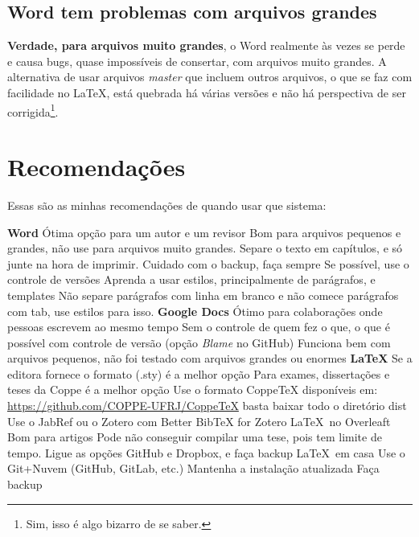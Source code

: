 \subsection{Word tem problemas com arquivos grandes}

\textbf{Verdade, para arquivos muito grandes}, o Word realmente às vezes se perde e causa bugs, quase impossíveis de consertar, com arquivos muito grandes. A alternativa de usar arquivos \textit{master} que incluem outros arquivos, o que se faz com facilidade no \LaTeX, está quebrada há várias versões e não há perspectiva de ser corrigida\footnote{Sim, isso é algo bizarro de se saber.}.

\section{Recomendações}

Essas são as minhas recomendações de quando usar que sistema:

\begin{outline} 
    \1 \textbf{Word}
    \2 Ótima opção para um autor e um revisor
    \2 Bom para arquivos pequenos e grandes, não use para arquivos muito grandes.
    \2 Separe o texto em capítulos, e só junte na hora de imprimir.
    \2 Cuidado com o backup, faça sempre
    \2 Se possível, use o controle de versões
    \2 Aprenda a usar estilos, principalmente de parágrafos, e templates
    \2 Não separe parágrafos com linha em branco e não comece parágrafos com tab, use estilos para isso.
    \1 \textbf{Google Docs}
    \2 Ótimo para colaborações onde pessoas escrevem ao mesmo tempo
    \2 Sem o controle de quem fez o que, o que é possível com controle de versão (opção \textit{Blame} no GitHub)
    \2 Funciona bem com arquivos pequenos, não foi testado com arquivos grandes ou enormes
    \1 \textbf{\LaTeX}
    \2 Se a editora fornece o formato (.sty) é a melhor opção
    \2 Para exames, dissertações e teses da Coppe é a melhor opção
    \3 Use o formato CoppeTeX disponíveis em: \url{https://github.com/COPPE-UFRJ/CoppeTeX}
    \3 basta baixar todo o diretório dist 
    \2 Use o JabRef ou o Zotero com Better BibTeX for Zotero
    \2 \LaTeX\ no Overleaft
    \3 Bom para artigos
    \3 Pode não conseguir compilar uma tese, pois tem limite de tempo.
    \3 Ligue as opções GitHub e Dropbox, e faça backup
    \2 \LaTeX\ em casa
    \3 Use o Git+Nuvem (GitHub, GitLab, etc.)
    \3 Mantenha a instalação atualizada
    \3 Faça backup
\end{outline}








